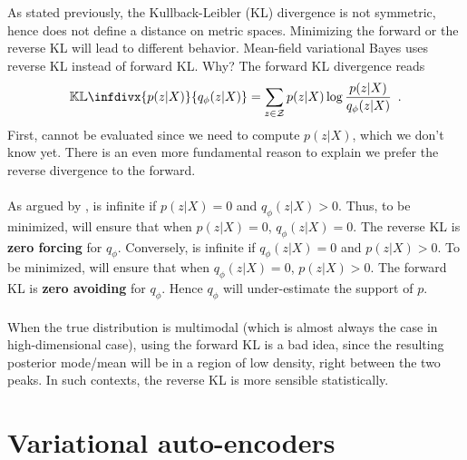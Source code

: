 \documentclass[12pt]{article}
\newcommand*\KL{\mathop{}\!\mathbb{KL}}
\newcommand{\infdiv}{\KL\infdivx}
\begin{document}
As stated previously, the Kullback-Leibler (KL) divergence is not symmetric, hence does not define a distance on metric spaces.
Minimizing the forward or the reverse KL will lead to different behavior.
Mean-field variational Bayes uses reverse KL instead of forward KL.
Why?
%
The forward KL divergence reads
%
\begin{equation}
    \label{eq:forward_kl_divergence}
    \infdiv{p(z \vert X)}{q_\phi(z \vert X)} = 
    \sum_{z \in \mathcal{Z}}
    p(z \vert X)
    \log
    \frac{p(z \vert X)}{q_\phi(z \vert X)}
    \enspace .
\end{equation}
%
First,  cannot be evaluated since we need to compute $p(z \vert X)$, which we don't know yet.
There is an even more fundamental reason to explain we prefer the reverse divergence to the forward.
\\
\\
As argued by \cite{PML_Murphy},  is infinite if $p(z \vert X) = 0$ and $q_\phi(z \vert X) > 0$.
Thus, to be minimized,  will ensure that when $p(z \vert X)= 0$, $q_\phi(z \vert X) = 0$.
The reverse KL is \textbf{zero forcing} for $q_\phi$.
Conversely,  is infinite if $q_\phi(z \vert X) = 0$ and $p(z \vert X) > 0$.
To be minimized,  will ensure that when $q_\phi(z \vert X) = 0$, $p(z \vert X) > 0$. 
The forward KL is \textbf{zero avoiding} for $q_\phi$.
Hence $q_\phi$ will under-estimate the support of $p$.
\\
\\
When the true distribution is multimodal (which is almost always the case in high-dimensional case), using the forward KL is a bad idea, since the resulting posterior mode/mean will be in a region of low density, right between the two peaks.
In such contexts, the reverse KL is more sensible statistically.

\section{Variational auto-encoders}
\end{document}
